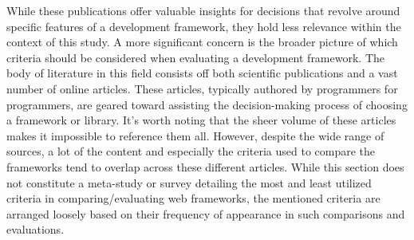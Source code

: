 While these publications offer valuable insights for decisions that revolve around specific features of a development framework, they hold less relevance within the context of this study.
A more significant concern is the broader picture of which criteria should be considered when evaluating a development framework.
The body of literature in this field consists off both scientific publications and a vast number of online articles. These articles, typically authored by programmers for programmers, are geared toward assisting the decision-making process of choosing a framework or library. It's worth noting that the sheer volume of these articles makes it impossible to reference them all. However, despite the wide range of sources, a lot of the content and especially the criteria used to compare the frameworks tend to overlap across these different articles.
While this section does not constitute a meta-study or survey detailing the most and least utilized criteria in comparing/evaluating web frameworks, the mentioned criteria are arranged loosely based on their frequency of appearance in such comparisons and evaluations.

